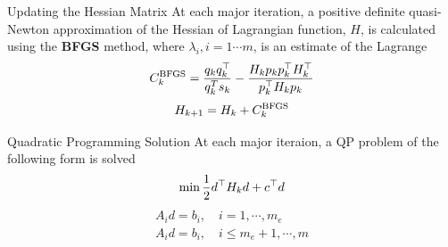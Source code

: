 \documentclass[10pt, compress]{beamer}
\begin{document}
\begin{frame}[fragile]{Updating the Hessian Matrix}
At each major iteration, a positive definite quasi-Newton approximation of the Hessian of Lagrangian function, $H$, is calculated using the \textbf{BFGS} method, where $\lambda_i, i = 1\cdots m$, is an estimate of the Lagrange
$$C_k^{\rm BFGS} = {q_kq_k^\top \over q_k^T s_k} - {H_k p_k p_k^\top H_k^\top \over p_k^\top H_k p_k}$$
$$H_{k+1} = H_{k} + C_k^{\rm BFGS}$$
\end{frame}

\begin{frame}[fragile]{Quadratic Programming Solution}
At each major iteraion, a QP problem of the following form is solved
$$\min {1 \over 2} d^\top H_k d + c^\top d$$
\begin{eqnarray*}
A_i d = b_i, \quad i = 1,\cdots , m_e \\
A_i d = b_i, \quad i \leq m_e + 1,\cdots , m
\end{eqnarray*}

\end{frame}
\end{document}
